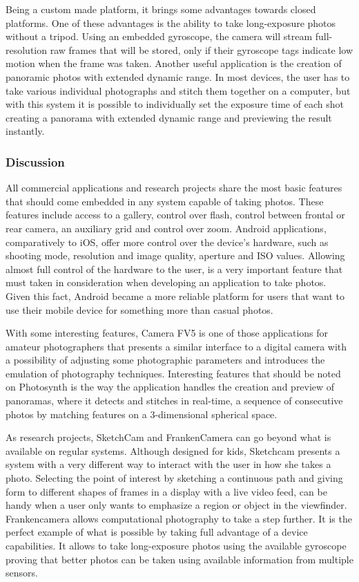 Being a custom made platform, it brings some advantages towards closed platforms. One of these advantages is the ability to take long-exposure photos without a tripod. Using an embedded gyroscope, the camera will stream full-resolution raw frames that will be stored, only if their gyroscope tags indicate low motion when the frame was taken. 
Another useful application is the creation of panoramic photos with extended dynamic range. In most devices, the user has to take various individual photographs and stitch them together on a computer, but with this system it is possible to individually set the exposure time of each shot creating a panorama with extended dynamic range and previewing the result instantly.

\subsubsection{Discussion}

All commercial applications and research projects share the most basic features that should come embedded in any system capable of taking photos. These features include access to a gallery, control over flash, control between frontal or rear camera, an auxiliary grid and control over zoom.
Android applications, comparatively to iOS, offer more control over the device's hardware, such as shooting mode, resolution and image quality, aperture and ISO values. Allowing almost full control of the hardware to the user, is a very important feature that must taken in consideration when developing an application to take photos. Given this fact, Android became a more reliable platform for users that want to use their mobile device for something more than casual photos.

With some interesting features, Camera FV5  is one of those applications for amateur photographers that presents a similar interface to a digital camera with a possibility of adjusting some photographic parameters and introduces the emulation of photography techniques.
Interesting features that should be noted on Photosynth is the way the application handles the creation and preview of panoramas, where it detects and stitches in real-time, a sequence of consecutive photos by matching features on a 3-dimensional spherical space.

As research projects, SketchCam and FrankenCamera can go beyond what is available on regular systems. Although designed for kids, Sketchcam presents a system with a very different way to interact with the user in how she takes a photo. Selecting the point of interest by sketching a continuous path and giving form to different shapes of frames in a display with a live video feed, can be handy when a user only wants to emphasize a region or object in the viewfinder.
Frankencamera allows computational photography to take a step further. It is the perfect example of what is possible by taking full advantage of a device capabilities. It allows to take long-exposure photos using the available gyroscope proving that better photos can be taken using available information from multiple sensors.


